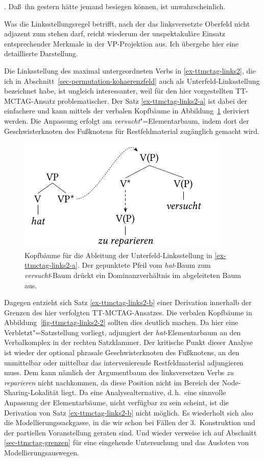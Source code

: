 \ex. \label{ex-ttmctag-links3} Da\ss\ ihn gestern hätte jemand besiegen können, ist unwahrscheinlich.

Was die Linksstellungsregel betrifft, nach der das linksversetzte Oberfeld nicht adjazent zum  stehen darf, reicht wiederum der unspektakuläre Einsatz entsprechender Merkmale in der VP-Projektion aus. Ich übergehe hier eine detaillierte Darstellung.

Die Linksstellung des maximal untergeordneten Verbs in \ref{ex-ttmctag-links2}, die ich in Abschnitt~\ref{sec-permutation-kohaerenzfeld} auch als Unterfeld-Linksstellung bezeichnet habe, ist ungleich interessanter, weil für den hier vorgestellten TT-MCTAG-Ansatz problematischer. Der Satz \ref{ex-ttmctag-links2-a} ist dabei der einfachere und kann mittels der verbalen Kopfbäume in Abbildung~\ref{fig-ttmctag-links2-1} deriviert werden. Die Anpassung erfolgt am {\it versucht}"=Elementarbaum, indem dort der Geschwisterknoten des Fu\ss knotens für Restfeldmaterial zugänglich gemacht wird.   
\begin{figure}[t]
\centering
\includegraphics{graphics/abb718.pdf}
\caption{\label{fig-ttmctag-links2-1}Kopfbäume für die Ableitung der Unterfeld-Linksstellung in \ref{ex-ttmctag-links2-a}. Der gepunktete Pfeil vom {\it hat}-Baum zum {\it versucht}-Baum drückt ein Dominanzverhältnis im abgeleiteten Baum aus.}
\end{figure}
Dagegen entzieht sich Satz \ref{ex-ttmctag-links2-b} einer Derivation innerhalb der Grenzen des hier verfolgten TT-MCTAG-Ansatzes. Die verbalen Kopfbäume in Abbildung~\ref{fig-ttmctag-links2-2} sollten dies deutlich machen. Da hier eine Verbletzt"=Satzstellung vorliegt, adjungiert der {\it hat}-Elementarbaum an den Verbalkomplex in der rechten Satzklammer. Der kritische Punkt dieser Analyse ist wieder der optional phrasale Geschwisterknoten des Fu\ss knotens, an den unmittelbar oder mittelbar das intervenierende Restfeldmaterial adjungieren muss. Dem kann nämlich der Argumentbaum des linksversetzen Verbs {\it zu reparieren} nicht nachkommen, da diese Position nicht im Bereich der Node-Sharing-Lokalität liegt. Da eine Analysealternative, d.\,h.\ eine sinnvolle Anpassung der Elementarbäume, nicht verfügbar zu sein scheint, ist die Derivation von Satz \ref{ex-ttmctag-links2-b} nicht möglich. Es wiederholt sich also die Modellierungssackgasse, in die wir schon bei Fällen der 3.~Konstruktion und der partiellen Voranstellung geraten sind. Und wieder verweise ich auf Abschnitt \ref{sec-ttmctag-grenzen} für eine eingehende Untersuchung und das Ausloten von Modellierungsauswegen.     

